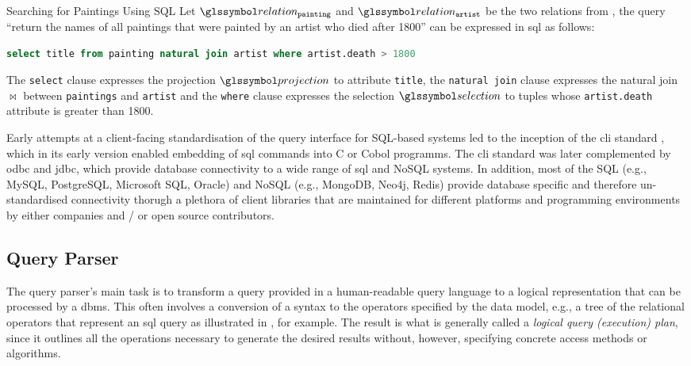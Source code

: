 \begin{example}[label=example:sql_query]{Searching for Paintings Using SQL}{}
    Let  $\relation_{\mathtt{painting}}$ and $\relation_{\mathtt{artist}}$ be the two relations from , the query ``return the names of all paintings that were painted by an artist who died after 1800'' can be expressed in \acrshort{sql} as follows:

    \begin{lstlisting}[language=SQL, showspaces=false, basicstyle=\ttfamily, numbers=none]
        select title from painting natural join artist where artist.death > 1800
    \end{lstlisting}

    The \texttt{select} clause expresses the projection $\projection$ to attribute \texttt{title}, the \texttt{natural join} clause expresses the natural join $\Join$ between \texttt{paintings} and \texttt{artist} and the \texttt{where} clause expresses the selection $\selection$ to tuples whose \texttt{artist.death} attribute is greater than 1800.
\end{example}

Early attempts at a client-facing standardisation of the query interface for SQL-based systems led to the inception of the \acrfull{cli} standard \cite{XOpen:1995CLI}, which in its early version enabled embedding of \acrshort{sql} commands into C or Cobol programms. The \acrshort{cli} standard was later complemented by \acrfull{odbc} and \acrfull{jdbc}, which provide database connectivity to a wide range of \acrshort{sql} and NoSQL systems. In addition, most of the SQL (e.g., MySQL, PostgreSQL, Microsoft SQL, Oracle) and NoSQL (e.g., MongoDB, Neo4j, Redis) provide database specific and therefore un-standardised connectivity thorugh a plethora of client libraries that are maintained for different platforms and programming environments by either companies and / or open source contributors.

\subsection{Query Parser}

The query parser's main task is to transform a query provided in a human-readable query language to a logical representation that can be processed by a \acrshort{dbms}. This often involves a conversion of a syntax to the operators specified by the data model, e.g., a tree of the relational operators that represent an \acrshort{sql} query as illustrated in , for example. The result is what is generally called a \emph{logical query (execution) plan}, since it outlines all the operations necessary to generate the desired results without, however, specifying concrete access methods or algorithms.

